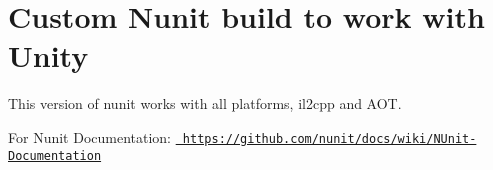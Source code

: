 \chapter{Custom Nunit build to work with Unity}
\hypertarget{md__library_2_package_cache_2com_8unity_8ext_8nunit_0d1_80_86_2_r_e_a_d_m_e}{}\label{md__library_2_package_cache_2com_8unity_8ext_8nunit_0d1_80_86_2_r_e_a_d_m_e}
\label{md__library_2_package_cache_2com_8unity_8ext_8nunit_0d1_80_86_2_r_e_a_d_m_e_autotoc_md209}%
%
 This version of nunit works with all platforms, il2cpp and  AOT.

For Nunit Documentation\+: \href{https://github.com/nunit/docs/wiki/NUnit-Documentation}{\texttt{ https\+://github.\+com/nunit/docs/wiki/\+NUnit-\/\+Documentation}} 